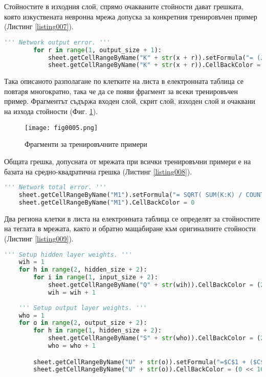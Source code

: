 Стойностите в изходния слой, спрямо очакваните стойности дават грешката, която изкуствената невронна мрежа допуска за конкретния тренировъчен пример (Листинг \ref{listing007}).

\begin{lstlisting}[caption=Стойност на грешката допусната от мрежата за конкретния пример, language=Python, basicstyle=\tiny, label=listing007]
        ''' Network output error. '''
        for r in range(1, output_size + 1):
            sheet.getCellRangeByName("K" + str(x + r)).setFormula("= (J" + str(x + r) + "-I" + str(x + r) + ") * (J" + str(x + r) + "-I" + str(x + r) + ")")
            sheet.getCellRangeByName("K" + str(x + r)).CellBackColor = (0 << 16 | 255 << 8 | 255)
\end{lstlisting}

Така описаното разполагане по клетките на листа в електронната таблица се повтаря многократно, така че да се появи фрагмент за всеки тренировъчен пример. Фрагментът съдържа входен слой, скрит слой, изходен слой и очаквани на изхода стойности (Фиг. \ref{fig005}).

\begin{figure}[H]
  \centering
  \texttt{[image: fig0005.png]}
  \caption{Фрагменти за тренировъчните примери}
\label{fig005}
\end{figure}

Общата грешка, допусната от мрежата при всички тренировъчни примери е на базата на средно-квадратична грешка (Листинг \ref{listing008}).

\begin{lstlisting}[caption=Обща средно-квадратична грешка на мрежата, language=Python, basicstyle=\tiny, label=listing008]
    ''' Network total error. '''
    sheet.getCellRangeByName("M1").setFormula("= SQRT( SUM(K:K) / COUNT(K:K) )")
    sheet.getCellRangeByName("M1").CellBackColor = 0
\end{lstlisting}

Два региона клетки в листа на електронната таблица се определят за стойностите на теглата в мрежата, както и обратно мащабиране към оригиналните стойности (Листинг \ref{listing009}).

\begin{lstlisting}[caption=Определяне на региони за теглата на мрежата, language=Python, basicstyle=\tiny, label=listing009]
    ''' Setup hidden layer weights. '''
    wih = 1
    for h in range(2, hidden_size + 2):
        for i in range(1, input_size + 2):
            sheet.getCellRangeByName("Q" + str(wih)).CellBackColor = (255 << 16 | 0 << 8 | 255)
            wih = wih + 1
        
    ''' Setup output layer weights. '''
    who = 1
    for o in range(2, output_size + 2):
        for h in range(1, hidden_size + 2):
            sheet.getCellRangeByName("S" + str(who)).CellBackColor = (255 << 16 | 0 << 8 | 255)
            who = who + 1

        sheet.getCellRangeByName("U" + str(o)).setFormula("=$C$1 + ($C$2 - $C$1) * ((T" + str(o) + " - $C$4) / ($C$5 - $C$4))")
        sheet.getCellRangeByName("U" + str(o)).CellBackColor = (0 << 16 | 127 << 8 | 0)
\end{lstlisting}

